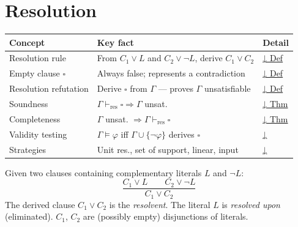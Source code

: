 
\section{Resolution}

\begin{tcolorbox}[colback=gray!6, colframe=gray!40, arc=2pt,
  left=6pt, right=6pt, top=4pt, bottom=4pt,
  title={\small\textbf{Resolution — Quick Reference}},
  fonttitle=\small\bfseries]
\small
\begin{tabular}{l l l}
\toprule
\textbf{Concept} & \textbf{Key fact} & \textbf{Detail} \\
\midrule
Resolution rule      & From $C_1\vee L$ and $C_2\vee\neg L$, derive $C_1\vee C_2$ & \hyperref[def:resolution]{↓ Def} \\
Empty clause $\square$ & Always false; represents a contradiction & \hyperref[def:empty-clause]{↓ Def} \\
Resolution refutation & Derive $\square$ from $\Gamma$ — proves $\Gamma$ unsatisfiable & \hyperref[def:refutation]{↓ Def} \\
Soundness            & $\Gamma\vdash_{\mathrm{res}}\square \Rightarrow \Gamma$ unsat. & \hyperref[thm:res-sound]{↓ Thm} \\
Completeness         & $\Gamma$ unsat. $\Rightarrow \Gamma\vdash_{\mathrm{res}}\square$ & \hyperref[thm:res-complete]{↓ Thm} \\
Validity testing     & $\Gamma\models\varphi$ iff $\Gamma\cup\{\neg\varphi\}$ derives $\square$ & \hyperref[rem:res-validity]{↓} \\
\midrule
Strategies & Unit res., set of support, linear, input & \hyperref[rem:res-strat]{↓} \\
\bottomrule
\end{tabular}
\end{tcolorbox}

\vspace{1em}

\begin{tcolorbox}[colback=propbox, colframe=propborder, arc=2pt,
  left=6pt, right=6pt, top=4pt, bottom=4pt,
  title={\small\textbf{Definition (Resolution Rule)}},
  fonttitle=\small\bfseries]
\label{def:resolution}
Given two clauses containing complementary literals $L$ and $\neg L$:
\[
\frac{C_1 \vee L \qquad C_2 \vee \neg L}{C_1 \vee C_2}
\]
The derived clause $C_1 \vee C_2$ is the \emph{resolvent}. The literal $L$
is \emph{resolved upon} (eliminated). $C_1$, $C_2$ are (possibly empty)
disjunctions of literals.
\end{tcolorbox}


